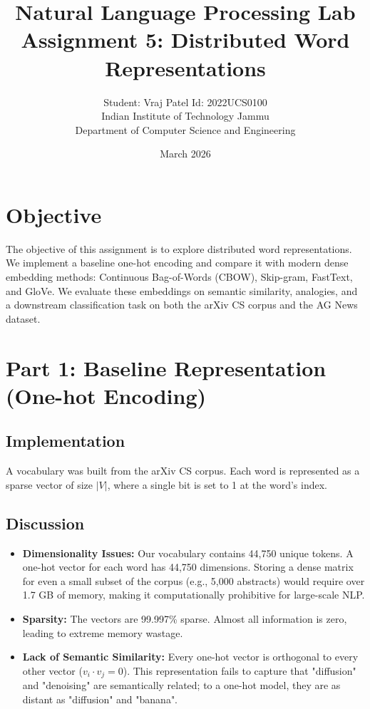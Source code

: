 \documentclass[11pt,a4paper]{article}
\title{\textbf{Natural Language Processing Lab \\ Assignment 5: Distributed Word Representations}}
\author{Student: Vraj Patel \quad Id: 2022UCS0100 \\ Indian Institute of Technology Jammu \\ Department of Computer Science and Engineering}
\date{March 2026}
\begin{document}
\maketitle

\section{Objective}
The objective of this assignment is to explore distributed word representations. We implement a baseline one-hot encoding and compare it with modern dense embedding methods: Continuous Bag-of-Words (CBOW), Skip-gram, FastText, and GloVe. We evaluate these embeddings on semantic similarity, analogies, and a downstream classification task on both the arXiv CS corpus and the AG News dataset.

\section{Part 1: Baseline Representation (One-hot Encoding)}
\subsection{Implementation}
A vocabulary was built from the arXiv CS corpus. Each word is represented as a sparse vector of size $|V|$, where a single bit is set to 1 at the word's index.

\subsection{Discussion}
\begin{itemize}
    \item \textbf{Dimensionality Issues:} Our vocabulary contains 44,750 unique tokens. A one-hot vector for each word has 44,750 dimensions. Storing a dense matrix for even a small subset of the corpus (e.g., 5,000 abstracts) would require over 1.7 GB of memory, making it computationally prohibitive for large-scale NLP.
    \item \textbf{Sparsity:} The vectors are 99.997\% sparse. Almost all information is zero, leading to extreme memory wastage.
    \item \textbf{Lack of Semantic Similarity:} Every one-hot vector is orthogonal to every other vector ($v_i \cdot v_j = 0$). This representation fails to capture that "diffusion" and "denoising" are semantically related; to a one-hot model, they are as distant as "diffusion" and "banana".
\end{itemize}
\end{document}
